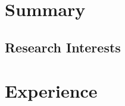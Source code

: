 \documentclass[letterpaper]{twentysecondcv} %
\begin{document}
\makeprofile %
 

\section{Summary}

\subsection{Research Interests}
\begin{itemize}
\end{itemize}

\section{Experience}

\begin{twenty} %
\end{twenty}
\end{document}
